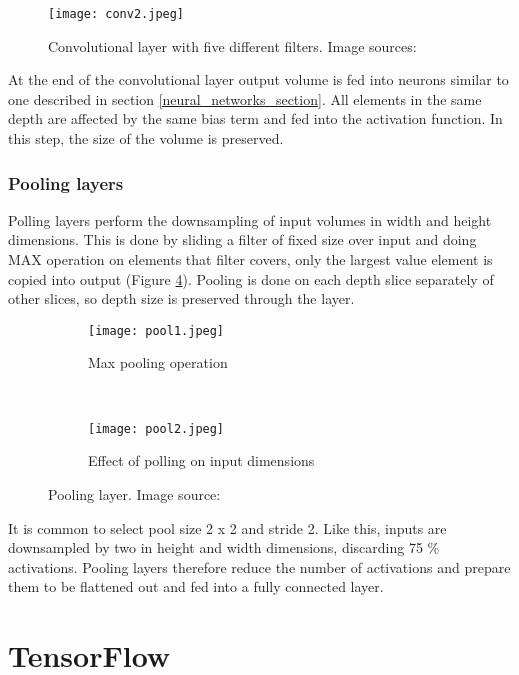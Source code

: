 \begin{figure}[ht] 
    \centering
    \texttt{[image: conv2.jpeg]} 
\caption[Convolutional layer with five different filters.] {Convolutional layer with five different filters. Image sources: \cite{conv_layer_img}\cite{cs231n}}
    \label{conv2}
\end{figure}

At the end of the convolutional layer output volume is fed into neurons similar to one described in section \ref{neural_networks_section}. 
All elements in the same depth are affected by the same bias term and fed into the activation function.
In this step, the size of the volume is preserved.

\subsubsection{ Pooling layers}

Polling layers perform the downsampling of input volumes in width and height dimensions.
This is done by sliding a filter of fixed size over input and doing MAX operation on elements that filter covers, only the largest value element is copied into output (Figure \ref{pool_layer}).
Pooling is done on each depth slice separately of other slices, so depth size is preserved through the layer.

\begin{figure}[ht] 
    \begin{subfigure}[b]{0.5\textwidth}
        \centering
        \texttt{[image: pool1.jpeg]} 
        \caption{Max pooling operation}
        \label{pool1}
    \end{subfigure}
    \unskip\ \vrule\ 
    \begin{subfigure}[b]{0.5\textwidth}
        \centering
        \texttt{[image: pool2.jpeg]} 
        \caption{ Effect of polling on input dimensions}
        \label{pool2}
    \end{subfigure}
    \caption[Polling layer.] {Pooling layer. Image source: \cite{cs231n}}
    \label{pool_layer}
\end{figure}

It is common to select pool size 2 x 2 and stride 2.
Like this, inputs are downsampled by two in height and width dimensions, discarding 75 \% activations.
Pooling layers therefore reduce the number of activations and prepare them to be flattened out and fed into a fully connected layer.

\section{ TensorFlow}

